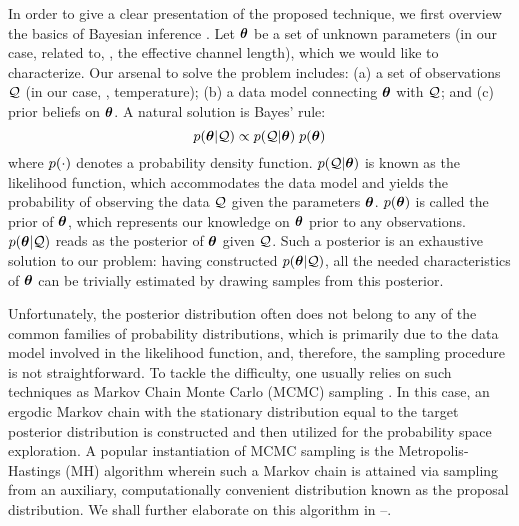 In order to give a clear presentation of the proposed technique, we first overview the basics of Bayesian inference \cite{gelman2004}.
Let ${\boldsymbol\theta}$ be a set of unknown parameters (in our case, related to, \eg, the effective channel length), which we would like to characterize.
Our arsenal to solve the problem includes: (a) a set of observations $\mathcal{Q}$ (in our case, \eg, temperature); (b) a data model connecting ${\boldsymbol\theta}$ with $\mathcal{Q}$; and (c) prior beliefs on ${\boldsymbol\theta}$.
A natural solution is Bayes' rule:
\begin{equation} \elabel{bayes}
  \f{\vparam | \QData} \propto \f{\QData | \vparam} \; \f{\vparam}
\end{equation}
where $\f{\cdot}$ denotes a probability density function.
$\f{\QData | \vparam}$ is known as the likelihood function, which accommodates the data model and yields the probability of observing the data $\mathcal{Q}$ given the parameters ${\boldsymbol\theta}$.
$\f{\vparam}$ is called the prior of ${\boldsymbol\theta}$, which represents our knowledge on ${\boldsymbol\theta}$ prior to any observations.
$\f{\vparam | \QData}$ reads as the posterior of ${\boldsymbol\theta}$ given $\mathcal{Q}$.
Such a posterior is an exhaustive solution to our problem: having constructed $\f{\vparam | \QData}$, all the needed characteristics of ${\boldsymbol\theta}$ can be trivially estimated by drawing samples from this posterior.

Unfortunately, the posterior distribution often does not belong to any of the common families of probability distributions, which is primarily due to the data model involved in the likelihood function, and, therefore, the sampling procedure is not straightforward.
To tackle the difficulty, one usually relies on such techniques as Markov Chain Monte Carlo (MCMC) sampling \cite{gelman2004}. In this case, an ergodic Markov chain with the stationary distribution equal to the target posterior distribution is constructed and then utilized for the probability space exploration.
A popular instantiation of MCMC sampling is the Metropolis-Hastings (MH) algorithm wherein such a Markov chain is attained via sampling from an auxiliary, computationally convenient distribution known as the proposal distribution. We shall further elaborate on this algorithm in --.
